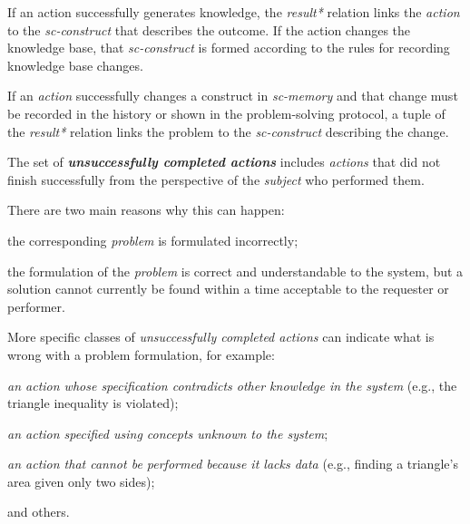 \begin{frame}{}
\justifying
\vspace{10mm}

If an action successfully generates knowledge, the \textit{result*} relation links the \textit{action} to the \textit{sc-construct} that describes the outcome. If the action changes the knowledge base, that \textit{sc-construct} is formed according to the rules for recording knowledge base changes.

\bigskip

If an \textit{action} successfully changes a construct in \textit{sc-memory} and that change must be recorded in the history or shown in the problem-solving protocol, a tuple of the \textit{result*} relation links the problem to the \textit{sc-construct} describing the change.
\end{frame}

\begin{frame}{}
\justifying
\vspace{10mm}

The set of \textbf{\textit{unsuccessfully completed actions}} includes \textit{actions} that did not finish successfully from the perspective of the \textit{subject} who performed them.

\bigskip

There are two main reasons why this can happen:
\begin{textitemize}
	\item the corresponding \textit{problem} is formulated incorrectly;
	\item the formulation of the \textit{problem} is correct and understandable to the system, but a solution cannot currently be found within a time acceptable to the requester or performer.
\end{textitemize}
\end{frame}

\begin{frame}{}
\justifying
\vspace{10mm}

More specific classes of \textit{unsuccessfully completed actions} can indicate what is wrong with a problem formulation, for example:
\begin{textitemize}
	\item \textit{an action whose specification contradicts other knowledge in the system} (e.g., the triangle inequality is violated);
	\item \textit{an action specified using concepts unknown to the system};
	\item \textit{an action that cannot be performed because it lacks data} (e.g., finding a triangle's area given only two sides);
	\item and others.
\end{textitemize}
\end{frame}

